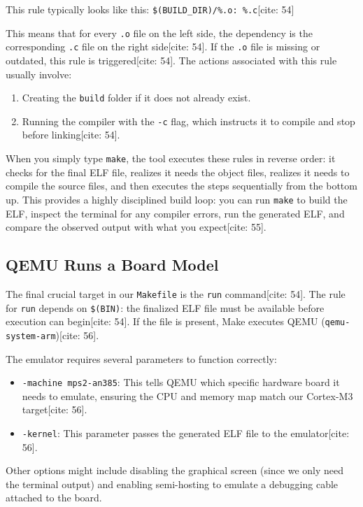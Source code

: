 This rule typically looks like this:
\texttt{\$(BUILD\_DIR)/\%.o: \%.c}[cite: 54]

This means that for every \texttt{.o} file on the left side, the dependency is the corresponding \texttt{.c} file on the right side[cite: 54]. If the \texttt{.o} file is missing or outdated, this rule is triggered[cite: 54]. The actions associated with this rule usually involve:
\begin{enumerate}
    \item Creating the \texttt{build} folder if it does not already exist.
    \item Running the compiler with the \texttt{-c} flag, which instructs it to compile and stop before linking[cite: 54].
\end{enumerate}

When you simply type \texttt{make}, the tool executes these rules in reverse order: it checks for the final ELF file, realizes it needs the object files, realizes it needs to compile the source files, and then executes the steps sequentially from the bottom up. 
This provides a highly disciplined build loop: you can run \texttt{make} to build the ELF, inspect the terminal for any compiler errors, run the generated ELF, and compare the observed output with what you expect[cite: 55].

\subsection{QEMU Runs a Board Model}
The final crucial target in our \texttt{Makefile} is the \texttt{run} command[cite: 54]. 
The rule for \texttt{run} depends on \texttt{\$(BIN)}: the finalized ELF file must be available before execution can begin[cite: 54]. If the file is present, Make executes QEMU (\texttt{qemu-system-arm})[cite: 56].

The emulator requires several parameters to function correctly:
\begin{itemize}
    \item \texttt{-machine mps2-an385}: This tells QEMU which specific hardware board it needs to emulate, ensuring the CPU and memory map match our Cortex-M3 target[cite: 56].
    \item \texttt{-kernel}: This parameter passes the generated ELF file to the emulator[cite: 56].
\end{itemize}
Other options might include disabling the graphical screen (since we only need the terminal output) and enabling semi-hosting to emulate a debugging cable attached to the board. 

